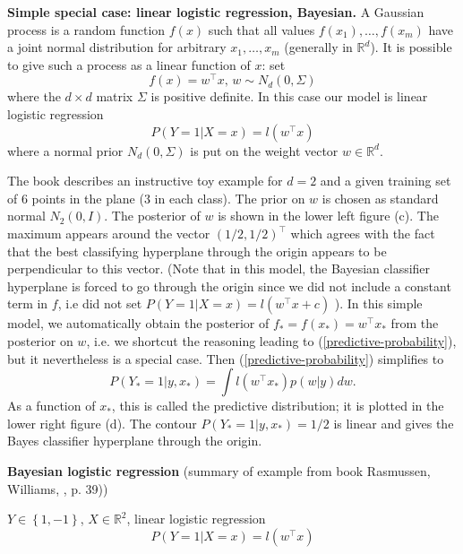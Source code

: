 \documentclass[11pt,twoside]{article}%
\theoremstyle{change}
\begin{document}
\textbf{Simple special case: linear logistic regression, Bayesian.} A Gaussian
process is a random function $f(x)$ such that all values $f(x_{1}%
),\ldots,f(x_{m})$ have a joint normal distribution for arbitrary
$x_{1},\ldots,x_{m}$ (generally in $\mathbb{R}^{d}$). It is possible to give
such a process as a linear function of $x$: set
\[
f(x)=w^{\top}x\text{, }w\sim N_{d}\left(  0,\Sigma\right)
\]
where the $d\times d$ matrix $\Sigma$ is positive definite. In this case our
model is linear logistic regression
\[
P\left(  Y=1|X=x\right)  =l\left(  w^{\top}x\right)
\]
where a normal prior $N_{d}\left(  0,\Sigma\right)  $ is put on the weight
vector $w\in\mathbb{R}^{d}$.

The book \cite{RW} describes an instructive toy example for $d=2$ and a given
training set of 6 points in the plane (3 in each class). The prior on $w$ is
chosen as standard normal $N_{2}\left(  0,I\right)  $. The posterior of $w$ is
shown in the lower left figure (c). The maximum appears around the vector
$(1/2,1/2)^{\top}$ which agrees with the fact that the best classifying
hyperplane through the origin appears to be perpendicular to this vector.
(Note that in this model, the Bayesian classifier hyperplane is forced to go
through the origin since we did not include a constant term in $f$, i.e did
not set $P\left(  Y=1|X=x\right)  =l\left(  w^{\top}x+c\right)  $ ). In this
simple model, we automatically obtain the posterior of $f_{\ast}=f(x_{\ast
})=w^{\top}x_{\ast}$ from the posterior on $w$, i.e. we shortcut the reasoning
leading to (\ref{predictive-probability}), but it nevertheless is a special
case. Then (\ref{predictive-probability}) simplifies to
\begin{equation}
P\left(  Y_{\ast}=1|y,x_{\ast}\right)  =\int l\left(  w^{\top}x_{\ast}\right)
p\left(  w|y\right)  dw.\label{predictive-probability-simplified}%
\end{equation}
As a function of $x_{\ast}$, this is called the predictive distribution; it is
plotted in the lower right figure (d). The contour $P\left(  Y_{\ast
}=1|y,x_{\ast}\right)  =1/2$ is linear and gives the Bayes classifier
hyperplane through the origin.

\bigskip

\textbf{Bayesian logistic regression } (summary of example from book
Rasmussen, Williams, \cite{RW}, p. 39))

$Y\in\left\{  1,-1\right\}  $, $X\in\mathbb{R}^{2}$, linear logistic
regression
\[
P\left(  Y=1|X=x\right)  =l\left(  w^{\top}x\right)
\]
\end{document}
